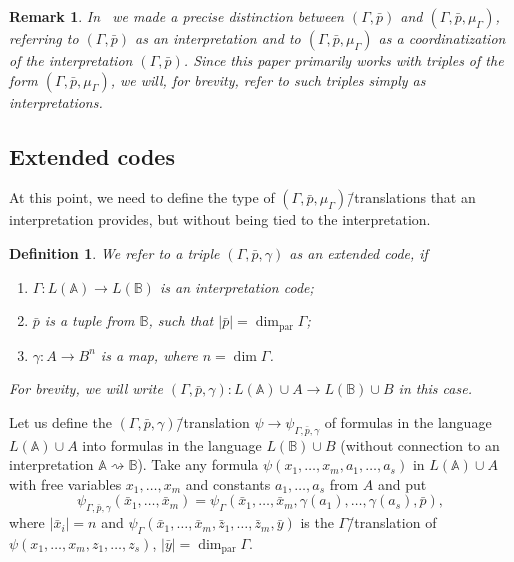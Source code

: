 \documentclass[12pt]{article}
\newtheorem{remark}{Remark}
\newtheorem{definition}{Definition}
\theoremstyle{definition}
\def\MA{{\mathbb{A}}}
\def\MB{{\mathbb{B}}}
\def\param{{\mathrm{par}}}
\begin{document}
\begin{remark}
In~\cite[Subsection~2.4]{Th_int1} we made a precise distinction between $(\Gamma,\bar p)$ and $(\Gamma,\bar p,\mu_\Gamma)$, referring to $(\Gamma,\bar p)$ as an \emph{interpretation} and to $(\Gamma,\bar p,\mu_\Gamma)$ as a \emph{coordinatization} of the interpretation $(\Gamma,\bar p)$. Since this paper primarily works with triples of the form $(\Gamma,\bar p,\mu_\Gamma)$, we will, for brevity, refer to such triples simply as interpretations.
\end{remark}

\subsection{Extended codes}\label{subsec:ext_code}

At this point, we need to define the type of $(\Gamma,\bar p,\mu_\Gamma)$\=/translations that an interpretation provides, but without being tied to the interpretation.

\begin{definition}\label{def:code}
 We refer to a triple $(\Gamma,\bar p,\gamma)$ as an {\em extended code}, if  
\begin{enumerate}[label=(T\arabic*)]
    \item\label{T1} $\Gamma\colon L(\MA)\to L(\MB)$ is an interpretation code;
    \item\label{T2} $\bar p$ is a tuple from $\MB$, such that $|\bar p|=\dim_\param\Gamma$;
    \item\label{T3} $\gamma\colon A\to B^n$ is a map, where $n=\dim\Gamma$.
\end{enumerate}  
For brevity, we will write $(\Gamma,\bar p,\gamma)\colon L(\MA)\cup A\to L(\MB)\cup B$ in this case.
\end{definition}

Let us define the $(\Gamma,\bar p, \gamma)$\=/translation $\psi\to \psi_{\Gamma,\bar p,\gamma}$ of formulas in the language $L(\MA)\cup A$ into formulas in the language $L(\MB)\cup B$ (without connection to an interpretation $\MA\rightsquigarrow\MB$). Take any formula $\psi(x_1,\ldots,x_m,a_1,\ldots,a_s)$ in  $L(\MA)\cup A$ with free variables $x_1,\ldots,x_m$ and constants $a_1,\ldots,a_s$ from $A$ and put
$$
\psi_{\Gamma,\bar p, \gamma}(\bar x_1,\ldots,\bar x_m)=\psi_\Gamma(\bar x_1,\ldots,\bar x_m,\gamma(a_1),\ldots,\gamma(a_s), \bar p),
$$
where $|\bar x_i|=n$ and $\psi_\Gamma(\bar x_1,\ldots,\bar x_m,\bar z_1,\ldots,\bar z_m,\bar y)$ is the $\Gamma$\=/translation of $\psi(x_1,\ldots,x_m,z_1,\ldots,z_s)$, $|\bar y|=\dim_{\param}\Gamma$.
\end{document}
